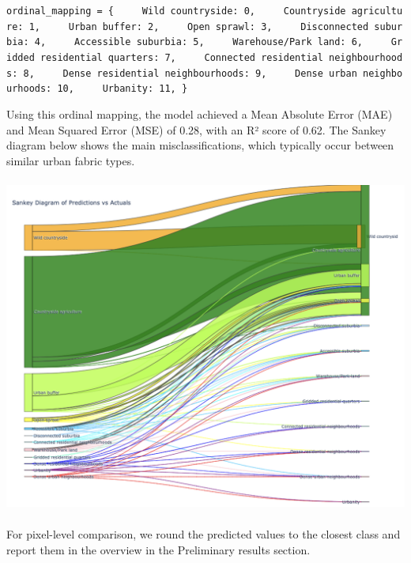 \documentclass[
  letterpaper,
  DIV=11,
  numbers=noendperiod]{scrartcl}
\begin{document}
\texttt{ordinal\_mapping\ =\ \{\ \ \ \ \ \textquotesingle{}Wild\ countryside\textquotesingle{}:\ 0,\ \ \ \ \ \textquotesingle{}Countryside\ agriculture\textquotesingle{}:\ 1,\ \ \ \ \ \textquotesingle{}Urban\ buffer\textquotesingle{}:\ 2,\ \ \ \ \ \textquotesingle{}Open\ sprawl\textquotesingle{}:\ 3,\ \ \ \ \ \textquotesingle{}Disconnected\ suburbia\textquotesingle{}:\ 4,\ \ \ \ \ \textquotesingle{}Accessible\ suburbia\textquotesingle{}:\ 5,\ \ \ \ \ \textquotesingle{}Warehouse/Park\ land\textquotesingle{}:\ 6,\ \ \ \ \ \textquotesingle{}Gridded\ residential\ quarters\textquotesingle{}:\ 7,\ \ \ \ \ \textquotesingle{}Connected\ residential\ neighbourhoods\textquotesingle{}:\ 8,\ \ \ \ \ \textquotesingle{}Dense\ residential\ neighbourhoods\textquotesingle{}:\ 9,\ \ \ \ \ \textquotesingle{}Dense\ urban\ neighbourhoods\textquotesingle{}:\ 10,\ \ \ \ \ \textquotesingle{}Urbanity\textquotesingle{}:\ 11,\ \}}

Using this ordinal mapping, the model achieved a Mean Absolute Error
(MAE) and Mean Squared Error (MSE) of 0.28, with an R² score of 0.62.
The Sankey diagram below shows the main misclassifications, which
typically occur between similar urban fabric types.

\begin{center}
\includegraphics[width=\linewidth,height=4.375in,keepaspectratio]{../figures/algo_design/sankey.png}
\end{center}

For pixel-level comparison, we round the predicted values to the closest
class and report them in the overview in the Preliminary results
section.
\end{document}
